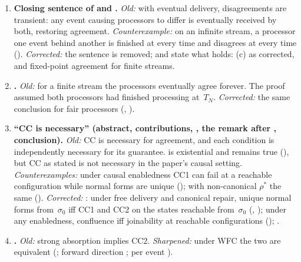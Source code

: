 \documentclass[11pt,a4paper]{article}
\theoremstyle{plain}
\theoremstyle{definition}
\theoremstyle{remark}
\begin{document}
\begin{enumerate}[leftmargin=*,label=\textbf{E\arabic*.},ref=E\arabic*]
\item \textbf{Closing sentence of  and
  .}
  \emph{Old:} with eventual delivery, disagreements are transient: any event
  causing processors to differ is eventually received by both, restoring
  agreement.
  \emph{Counterexample:} on an infinite stream, a processor one event behind
  another is finished at every time and disagrees at every time
  ().
  \emph{Corrected:} the sentence is removed;  and
   state what holds: (c) as corrected, and
  fixed-point agreement for finite streams.

\item \textbf{.}
  \emph{Old:} for a finite stream the processors eventually agree forever.
  The proof assumed both processors had finished processing at~$T_N$.
  \emph{Corrected:} the same conclusion for fair processors
  (, ).

\item \textbf{``CC is necessary'' (abstract, contributions,
  , the remark after ,
  conclusion).}
  \emph{Old:} CC is necessary for agreement, and each condition is
  independently necessary for its guarantee.   is
  existential and remains true (), but CC as stated is
  not necessary in the paper's causal setting.
  \emph{Counterexamples:} under causal enabledness CC1 can fail at a
  reachable configuration while normal forms are unique
  (); with non-canonical $\rho^*$ the same
  ().
  \emph{Corrected:} : under free delivery and canonical
  repair, unique normal forms from~$\sigma_0$ iff CC1 and CC2 on the states
  reachable from~$\sigma_0$ (, );
  under any enabledness, confluence iff joinability at reachable
  configurations (); .

\item \textbf{.}
  \emph{Old:} strong absorption implies CC2.
  \emph{Sharpened:} under WFC the two are equivalent
  (; forward direction
  ; per event
  ).


\end{enumerate}
\end{document}
